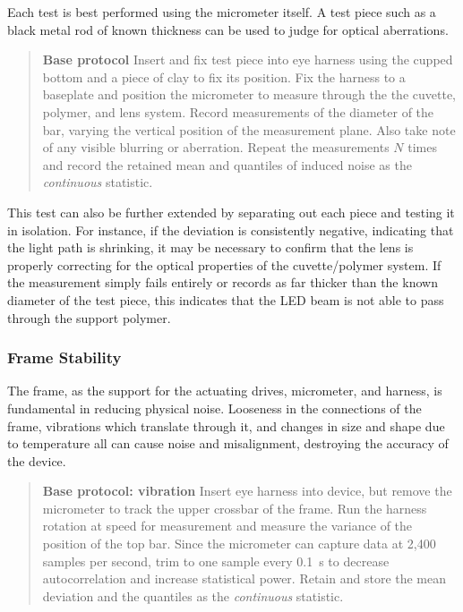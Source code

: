 \documentclass{article}
\begin{document}
Each test is best performed using the micrometer itself. A test piece such as a black metal rod of known thickness can be used to judge for optical aberrations.

\begin{quotation}
  \textbf{Base protocol} Insert and fix test piece into eye harness using the cupped bottom and a piece of clay to fix its position. Fix the harness to a baseplate and position the micrometer to measure through the the cuvette, polymer, and lens system. Record measurements of the diameter of the bar, varying the vertical position of the measurement plane. Also take note of any visible blurring or aberration. Repeat the measurements $N$ times and record the retained mean and quantiles of induced noise as the \textit{continuous} statistic.
\end{quotation}

This test can also be further extended by separating out each piece and testing it in isolation. For instance, if the deviation is consistently negative, indicating that the light path is shrinking, it may be necessary to confirm that the lens is properly correcting for the optical properties of the cuvette/polymer system. If the measurement simply fails entirely or records as far thicker than the known diameter of the test piece, this indicates that the LED beam is not able to pass through the support polymer.


\subsubsection{Frame Stability}
The frame, as the support for the actuating drives, micrometer, and harness, is fundamental in reducing physical noise. Looseness in the connections of the frame, vibrations which translate through it, and changes in size and shape due to temperature all can cause noise and misalignment, destroying the accuracy of the device.

\begin{quotation}
  \textbf{Base protocol: vibration} Insert eye harness into device, but   remove the micrometer to track the upper crossbar of the frame. Run   the harness rotation at speed for measurement and measure the   variance of the position of the top bar. Since the micrometer can   capture data at 2,400 samples per second, trim to one sample every   \SI{0.1}{\second} to decrease autocorrelation and increase   statistical power. Retain and store the mean deviation and the   quantiles as the \textit{continuous} statistic.
\end{quotation}
\end{document}
